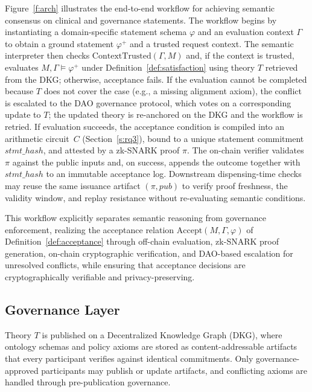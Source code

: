\documentclass[journal]{IEEEtran}
\begin{document}
Figure~\ref{f:arch} illustrates the end-to-end workflow for achieving semantic consensus on clinical and governance statements. The workflow begins by instantiating a domain-specific statement schema $\varphi$ and an evaluation context $\Gamma$ to obtain a ground statement $\varphi^{+}$ and a trusted request context. The semantic interpreter then checks $\mathrm{ContextTrusted}(\Gamma, M)$ and, if the context is trusted, evaluates $M,\Gamma\models\varphi^{+}$ under Definition~\ref{def:satisfaction} using theory $T$ retrieved from the DKG; otherwise, acceptance fails. If the evaluation cannot be completed because $T$ does not cover the case (e.g., a missing alignment axiom), the conflict is escalated to the DAO governance protocol, which votes on a corresponding update to $T$; the updated theory is re-anchored on the DKG and the workflow is retried. If evaluation succeeds, the acceptance condition is compiled into an arithmetic circuit~$C$ (Section~\ref{s:rq3}), bound to a unique statement commitment $\mathit{stmt\_hash}$, and attested by a zk-SNARK proof $\pi$. The on-chain verifier validates $\pi$ against the public inputs and, on success, appends the outcome together with $\mathit{stmt\_hash}$ to an immutable acceptance log. Downstream dispensing-time checks may reuse the same issuance artifact $(\pi,\mathit{pub})$ to verify proof freshness, the validity window, and replay resistance without re-evaluating semantic conditions.

This workflow explicitly separates semantic reasoning from governance enforcement, realizing the acceptance relation $\mathrm{Accept}(M, \Gamma, \varphi)$ of Definition~\ref{def:acceptance} through off-chain evaluation, zk-SNARK proof generation, on-chain cryptographic verification, and DAO-based escalation for unresolved conflicts, while ensuring that acceptance decisions are cryptographically verifiable and privacy-preserving.

\subsection{Governance Layer}
\label{sec:governance-layer}

Theory $T$ is published on a Decentralized Knowledge Graph (DKG), where ontology schemas and policy axioms are stored as content-addressable artifacts that every participant verifies against identical commitments. Only governance-approved participants may publish or update artifacts, and conflicting axioms are handled through pre-publication governance.
\end{document}
